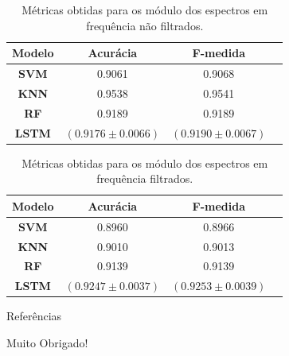 \documentclass[aspectratio=169]{beamer}
\begin{document}
\begin{frame}
	\begin{minipage}{0.5\textwidth}
	\tiny
	\begin{table}[H]
		\begin{center}
		\caption{Métricas obtidas para os módulo dos espectros em frequência não filtrados.}
		\begin{tabular}{c c c c}
		\toprule
		\textbf{Modelo} & \textbf{Acurácia} & \textbf{F-medida} \\
		\midrule
		\textbf{SVM} & 0.9061 & 0.9068\\
		\textbf{KNN} & 0.9538 & 0.9541\\
		\textbf{RF} & 0.9189 & 0.9189\\
		\textbf{LSTM} & $(0.9176 \pm 0.0066)$ & $(0.9190 \pm 0.0067)$\\
		\bottomrule
		\end{tabular}
		\end{center}
	\end{table}
	\end{minipage}
	\hfill
	\begin{minipage}{0.5\textwidth}
	\tiny
	\begin{table}[H]
		\begin{center}
		\caption{Métricas obtidas para os módulo dos espectros em frequência filtrados.}
		\begin{tabular}{c c c c}
		\toprule
		\textbf{Modelo} & \textbf{Acurácia} & \textbf{F-medida} \\
		\midrule
		\textbf{SVM} & 0.8960 & 0.8966\\
		\textbf{KNN} & 0.9010 & 0.9013\\
		\textbf{RF} & 0.9139 & 0.9139\\
		\textbf{LSTM} & $(0.9247 \pm 0.0037)$ & $(0.9253 \pm 0.0039)$\\
		\bottomrule
		\end{tabular}
		\end{center}
	\end{table}
	\end{minipage}
	
\end{frame}

\appendix

\begin{frame}{Referências}
    \tiny
    
    
\end{frame}

\begin{frame}[plain,c]
    \begin{center}
    \Huge Muito Obrigado!
    \end{center}
\end{frame}
\end{document}
